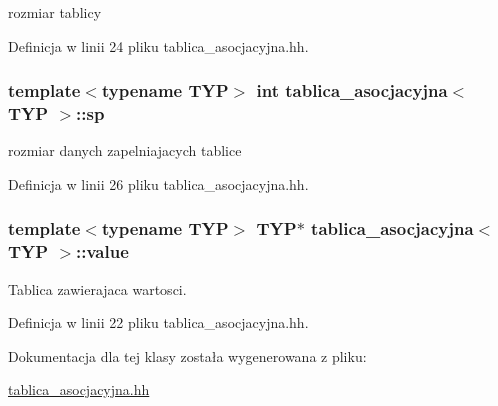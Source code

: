 rozmiar tablicy 



\-Definicja w linii 24 pliku tablica\-\_\-asocjacyjna.\-hh.

\hypertarget{classtablica__asocjacyjna_a2af0a8be0f335f5ad09f908cb08c0039}{
\subsubsection[{sp}]{\setlength{\rightskip}{0pt plus 5cm}template$<$typename \-T\-Y\-P$>$ int {\bf tablica\-\_\-asocjacyjna}$<$ \-T\-Y\-P $>$\-::{\bf sp}}}\label{classtablica__asocjacyjna_a2af0a8be0f335f5ad09f908cb08c0039}


rozmiar danych zapelniajacych tablice 



\-Definicja w linii 26 pliku tablica\-\_\-asocjacyjna.\-hh.

\hypertarget{classtablica__asocjacyjna_a28719743b86b0a16db652afda20b665c}{
\subsubsection[{value}]{\setlength{\rightskip}{0pt plus 5cm}template$<$typename \-T\-Y\-P$>$ \-T\-Y\-P$\ast$ {\bf tablica\-\_\-asocjacyjna}$<$ \-T\-Y\-P $>$\-::{\bf value}}}\label{classtablica__asocjacyjna_a28719743b86b0a16db652afda20b665c}


\-Tablica zawierajaca wartosci. 



\-Definicja w linii 22 pliku tablica\-\_\-asocjacyjna.\-hh.



\-Dokumentacja dla tej klasy została wygenerowana z pliku\-:\begin{DoxyCompactItemize}
\item 
\hyperlink{tablica__asocjacyjna_8hh}{tablica\-\_\-asocjacyjna.\-hh}\end{DoxyCompactItemize}
